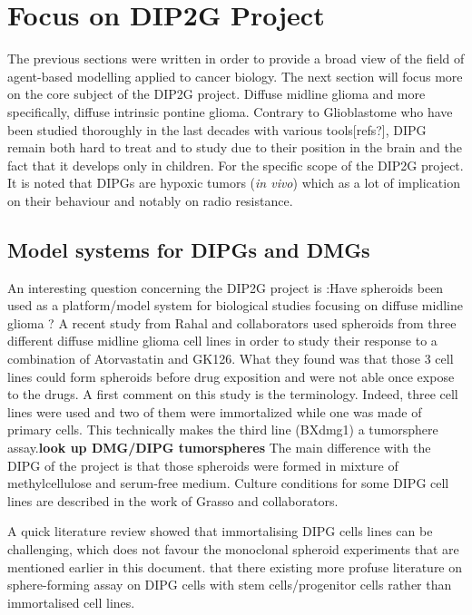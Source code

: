 \documentclass[11pt,a4paper]{article}
\begin{document}
\section{Focus on DIP2G Project}
The previous sections were written in order to provide a broad view of the field of agent-based modelling applied to cancer biology. The next section will focus more on the core subject of the DIP2G project. Diffuse midline glioma and more specifically, diffuse intrinsic pontine glioma. Contrary to Glioblastome who have been studied thoroughly in the last decades with various tools[refs?], DIPG remain both hard to treat and to study due to their position in the brain and the fact that it develops only in children. For the specific scope of the DIP2G project. It is noted that DIPGs are hypoxic tumors (\textit{in vivo}) which as a lot of implication on their behaviour and notably on radio resistance.\cite{Cook2021}


\subsection{Model systems for DIPGs and DMGs}
An interesting question concerning the DIP2G project is :Have spheroids been used as a platform/model system for biological studies focusing on diffuse midline glioma ? A recent study from Rahal and collaborators used spheroids from three different diffuse midline glioma cell lines in order to study their response to a combination of Atorvastatin and GK126.\cite{Rahal2022} What they found was that those 3 cell lines could form spheroids before drug exposition and were not able once expose to the drugs. A first comment on this study is the terminology. Indeed, three cell lines were used and two of them were immortalized while one was made of primary cells. This technically makes the third line (BXdmg1) a tumorsphere assay.\textbf{look up DMG/DIPG tumorspheres} The main difference with the DIPG of the project is that those spheroids were formed in mixture of methylcellulose and serum-free medium. Culture conditions for some DIPG cell lines are described in the work of Grasso and collaborators. \cite{Grasso2015}%

A quick literature review showed that immortalising DIPG cells lines can be challenging, which does not favour the monoclonal spheroid experiments that are mentioned earlier in this document.\cite{Sun2019}\cite{Meel2018} that there existing more profuse literature on sphere-forming assay on DIPG cells with stem cells/progenitor cells rather than immortalised cell lines.
\end{document}
